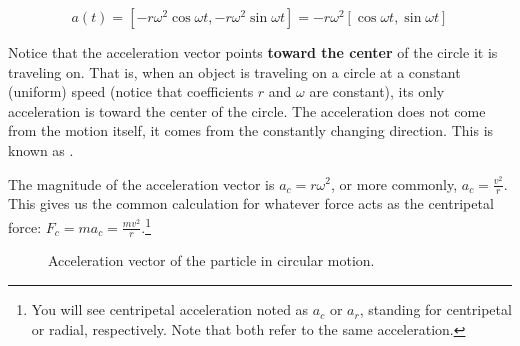 $$a(t) = \left[-r \omega^2 \cos{\omega t}, -r \omega^2 \sin{\omega t} \right] = -r\omega^2 \left[\cos{\omega t}, \sin{\omega t}\right]$$

Notice that the acceleration vector points \textbf{toward the center} of the
circle it is traveling on. That is, when an object is traveling on a
circle at a constant (uniform) speed (notice that coefficients $r$ and $\omega$ are constant), its only acceleration is toward the center of the circle. The acceleration does not come from the motion itself, it comes from the constantly changing direction. This is known as . 

The magnitude of the acceleration vector is $a_c =r \omega^2$, or more commonly, $a_c = \frac{v^2}{r}$. This gives us the common calculation for whatever force acts as the centripetal force: $F_c = m a_c = \frac{m v^2}{r}$.\footnote{You will see centripetal acceleration noted as $a_c$ or $a_r$, standing for centripetal or radial, respectively. Note that both refer to the same acceleration.}

\begin{figure}[H]
  \begin{center}
  \end{center}
  \caption{Acceleration vector of the particle in circular motion.}
  \label{fig:billardBallAcceleration}
\end{figure}

